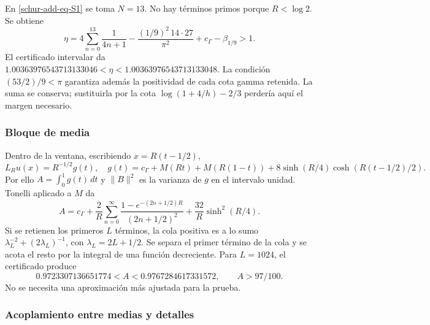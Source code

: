 En \eqref{schur-add-eq-S1} se toma \(N=13\). No hay términos primos porque
\(R<\log2\). Se obtiene
\begin{equation}
\eta=4\sum_{n=0}^{13}\frac1{4n+1}
-\frac{(1/9)^2\,14\cdot27}{\pi^2}+c_\Gamma-\beta_{1/9}>1.
\label{schur-add-eq-S9}
\end{equation}
El certificado intervalar da
\(1.00363976543713133046<\eta<1.00363976543713133048\).
La condición \((53/2)/9<\pi\) garantiza además la positividad de
cada cota gamma retenida. La suma se conserva; sustituirla por la
cota \(\log(1+4/h)-2/3\) perdería aquí el margen necesario.

\subsubsection{Bloque de media}
\label{schur-add-sub-269}

Dentro de la ventana, escribiendo \(x=R(t-1/2)\),
\begin{equation}
L_Ru(x)=R^{-1/2}g(t),\quad
g(t)=c_\Gamma+M(Rt)+M(R(1-t))
+8\sinh(R/4)\cosh(R(t-1/2)/2).
\label{schur-add-display-22}
\end{equation}
Por ello \(A=\int_0^1g(t)\,dt\) y \(\|B\|^2\) es la varianza
de \(g\) en el intervalo unidad. Tonelli aplicado a \(M\) da
\begin{equation}
A=c_\Gamma+\frac2R\sum_{n=0}^\infty
\frac{1-e^{-(2n+1/2)R}}{(2n+1/2)^2}
+\frac{32}R\sinh^2(R/4).
\label{schur-add-eq-S10}
\end{equation}
Si se retienen los primeros \(L\) términos, la cola positiva es a lo
sumo \(\lambda_L^{-2}+(2\lambda_L)^{-1}\), con
\(\lambda_L=2L+1/2\). Se separa el primer término de la cola y se
acota el resto por la integral de una función decreciente. Para
\(L=1024\), el certificado produce
\begin{equation}
0.9723307136651774<A<0.9767284617331572,
\qquad A>97/100.
\label{schur-add-eq-S11}
\end{equation}
No se necesita una aproximación más ajustada para la prueba.

\subsubsection{Acoplamiento entre medias y detalles}
\label{schur-add-sub-295}

